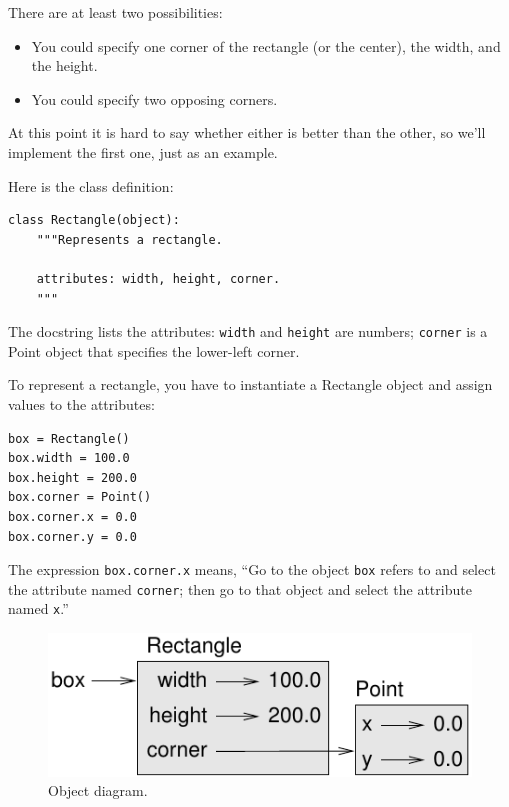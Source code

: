 \documentclass[10pt]{book}
\begin{document}
\begin{CJK}{UTF8}{gbsn}
There are at least two possibilities: 

\begin{itemize}

\item You could specify one corner of the rectangle
(or the center), the width, and the height.

\item You could specify two opposing corners.

\end{itemize}

At this point it is hard to say whether either is better than
the other, so we'll implement the first one, just as an example.

Here is the class definition:

\begin{verbatim}
class Rectangle(object):
    """Represents a rectangle. 

    attributes: width, height, corner.
    """
\end{verbatim}
%
The docstring lists the attributes:  {\tt width} and
{\tt height} are numbers; {\tt corner} is a Point object that
specifies the lower-left corner.

To represent a rectangle, you have to instantiate a Rectangle
object and assign values to the attributes:

\begin{verbatim}
box = Rectangle()
box.width = 100.0
box.height = 200.0
box.corner = Point()
box.corner.x = 0.0
box.corner.y = 0.0
\end{verbatim}
%
The expression {\tt box.corner.x} means,
``Go to the object {\tt box} refers to and select the attribute named
{\tt corner}; then go to that object and select the attribute named
{\tt x}.''

\begin{figure}
\centerline
{\includegraphics[scale=0.8]{figs/rectangle.pdf}}
\caption{Object diagram.}
\label{fig.rectangle}
\end{figure}



\end{CJK}
\end{document}
